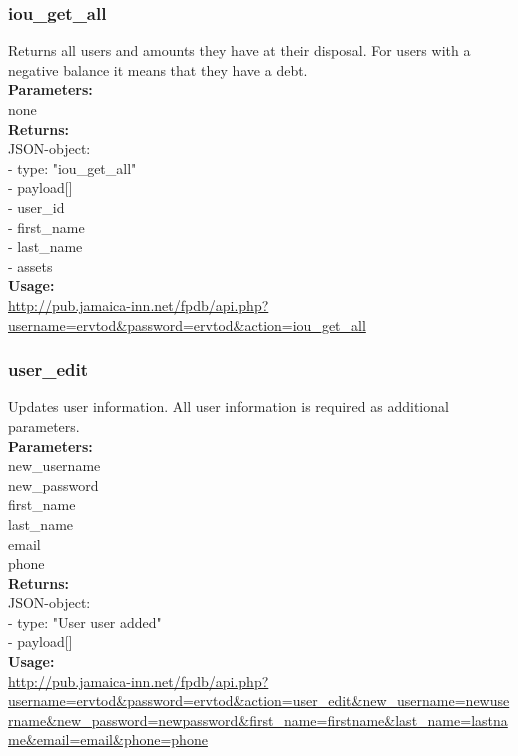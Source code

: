 \documentclass{article}
\begin{document}
\subsubsection{iou\_get\_all}
Returns all users and amounts they have at their disposal. For users with a negative balance it means that they have a debt.\\
\textbf{Parameters:}\\
none\\
\textbf{Returns:}\\
JSON-object:\\
- type: "iou\_get\_all"\\
- payload[]\\
\indent - user\_id\\
\indent - first\_name\\
\indent - last\_name\\
\indent - assets\\
\textbf{Usage:}\\
\url{http://pub.jamaica-inn.net/fpdb/api.php?username=ervtod\&password=ervtod\&action=iou\_get\_all}\\
    
\subsubsection{user\_edit}
Updates user information. All user information is required as additional parameters.\\
\textbf{Parameters:}\\
new\_username\\
new\_password\\
first\_name\\
last\_name\\
email\\
phone\\
\textbf{Returns:}\\
JSON-object:\\
- type: "User user added"\\
- payload[]\\
\textbf{Usage:}\\
\url{http://pub.jamaica-inn.net/fpdb/api.php?username=ervtod\&password=ervtod\&action=user\_edit\&new\_username=newusername\&new\_password=newpassword\&first\_name=firstname\&last\_name=lastname\&email=email\&phone=phone}\\
 
\end{document}
